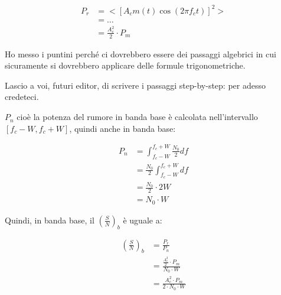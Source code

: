{
    \Large 
    \begin{equation}
        \begin{split}
            P_r
            &= 
             <  
       \left[
        A_c m(t) \cos(2 \pi f_c t) 
       \right]^{2} 
    > 
    \\
    &=
    \dots
    \\
    &= 
    \frac{A_c ^{2}}{2} \cdot P_m
    \end{split}
    \end{equation}
}

\begin{tcolorbox}
    Ho messo i puntini perché ci dovrebbero essere dei passaggi algebrici in cui sicuramente si dovrebbero applicare delle formule trigonometriche. \newline 

    Lascio a voi, futuri editor, di scrivere i passaggi step-by-step: per adesso credeteci. 
\end{tcolorbox}

$P_n$ cioè la potenza del rumore in banda base è calcolata nell'intervallo $[f_c -W , f_c + W]$, 
quindi anche in banda base: 

{
    \Large 
    \begin{equation}
        \begin{split}
        P_n 
        &=  
        \int_{f_c -W }^{f_c + W} \frac{N_0}{2} df 
        \\
        &=
        \frac{N_0}{2} \int_{f_c -W }^{f_c + W} df
        \\
        &= 
        \frac{N_0}{2} \cdot 2 W
        \\
        &= 
        N_0 \cdot W
        \end{split}
    \end{equation}
}

Quindi, in banda base, il $\left( \frac{S}{N} \right)_{b} $ è uguale a: 

{
    \Large 
    \begin{equation}
        \begin{split}
            \left(
                \frac{S}{N}
            \right)_{b} 
            &=
            \frac{P_r}{P_n}
            \\
            &= 
            \frac{\frac{A_c^{2}}{2} \cdot P_m}{N_0 \cdot W}
            \\
            &= 
            \frac{A_c^{2} \cdot P_m}{2 \cdot N_0 \cdot W}
        \end{split}
    \end{equation}
}

